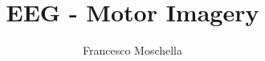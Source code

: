 \documentclass{unicam_thesis}
\title{EEG - Motor Imagery}
\subtitle{}
\author{Francesco Moschella}%
\begin{document}
\maketitle

\tableofcontents
\lstlistoflistings
\listoffigures
\listoftables







% 

\appendix

\printbibliography
%
\end{document}
